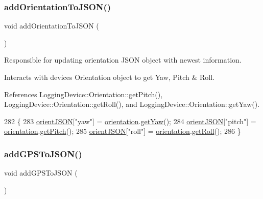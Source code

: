 \subsubsection{\texorpdfstring{add\+Orientation\+To\+J\+S\+O\+N()}{addOrientationToJSON()}}
{\footnotesize\ttfamily void add\+Orientation\+To\+J\+S\+ON (\begin{DoxyParamCaption}{ }\end{DoxyParamCaption})}



Responsible for updating orientation J\+S\+ON object with newest information. 

Interacts with devices Orientation object to get Yaw, Pitch \& Roll. 

References Logging\+Device\+::\+Orientation\+::get\+Pitch(), Logging\+Device\+::\+Orientation\+::get\+Roll(), and Logging\+Device\+::\+Orientation\+::get\+Yaw().


\begin{DoxyCode}
282 \{
283   \hyperlink{logging-device_8ino_ae8e95a76df2aaa373792e5b744a6bb73}{orientJSON}[\textcolor{stringliteral}{"yaw"}] = \hyperlink{logging-device_8ino_a47be0262307aa023a1bda3d98986a16d}{orientation}.\hyperlink{class_logging_device_1_1_orientation_a3dbaa1ee014811c40d5b9f39b544c19b}{getYaw}();
284   \hyperlink{logging-device_8ino_ae8e95a76df2aaa373792e5b744a6bb73}{orientJSON}[\textcolor{stringliteral}{"pitch"}] = \hyperlink{logging-device_8ino_a47be0262307aa023a1bda3d98986a16d}{orientation}.\hyperlink{class_logging_device_1_1_orientation_a7ec1a2964fc858bbd5da22a505b087c8}{getPitch}();
285   \hyperlink{logging-device_8ino_ae8e95a76df2aaa373792e5b744a6bb73}{orientJSON}[\textcolor{stringliteral}{"roll"}] = \hyperlink{logging-device_8ino_a47be0262307aa023a1bda3d98986a16d}{orientation}.\hyperlink{class_logging_device_1_1_orientation_ab8923432cb8c18822b0a9ae95a5ac505}{getRoll}();
286 \}
\end{DoxyCode}
\mbox{\label{logging-device_8ino_af1705fad6a6282b24379a174e18d4fe4}} 
\subsubsection{\texorpdfstring{add\+G\+P\+S\+To\+J\+S\+O\+N()}{addGPSToJSON()}}
{\footnotesize\ttfamily void add\+G\+P\+S\+To\+J\+S\+ON (\begin{DoxyParamCaption}{ }\end{DoxyParamCaption})}



